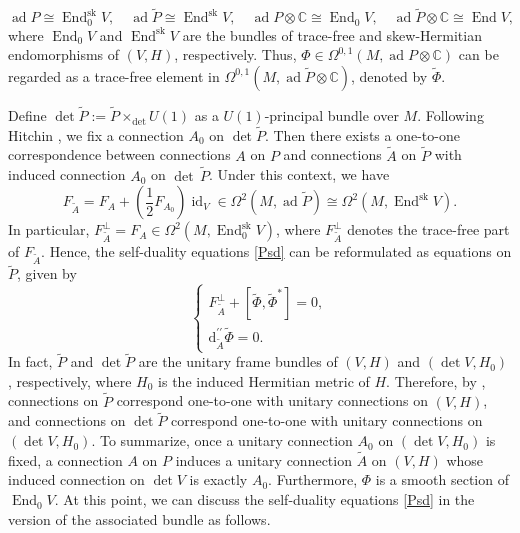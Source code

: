 \documentclass[a4paper]{amsart}
\theoremstyle{definition}
\theoremstyle{remark}
\numberwithin{equation}{section}
\begin{document}
\[
\operatorname{ad} P \cong \operatorname{End}_0^{\text{sk}} V, \quad \operatorname{ad} \tilde{P} \cong \operatorname{End}^{\text{sk}} V, \quad \operatorname{ad} P \otimes \mathbb{C} \cong \operatorname{End}_0 V, \quad \operatorname{ad} \tilde{P} \otimes \mathbb{C} \cong \operatorname{End} V,
\]
where $\operatorname{End}_0 V$ and $\operatorname{End}^{\text{sk}} V$ are the bundles of trace-free and skew-Hermitian endomorphisms of $(V, H)$, respectively. Thus, $\Phi \in \Omega^{0,1}(M, \operatorname{ad} P \otimes \mathbb{C})$ can be regarded as a trace-free element in $\Omega^{0,1}(M, \operatorname{ad} \tilde{P} \otimes \mathbb{C})$, denoted by $\tilde \Phi$.

Define $\det \tilde{P} := \tilde P \times_{\det} U(1)$ as a $U(1)$-principal bundle over $M$. Following Hitchin \cite[Section 2]{hitchin1987self}, we fix a connection $A_0$ on $\det \tilde{P}$. Then there exists a one-to-one correspondence between connections $A$ on $P$ and connections $\tilde{A}$ on $\tilde{P}$ with induced connection $A_0$ on $\det\,\tilde{P}$. Under this context, we have
\[
F_{\tilde{A}} = F_A + \left(\frac{1}{2} F_{A_0}\right) \operatorname{id}_V \in \Omega^2(M, \operatorname{ad} \tilde{P}) \cong \Omega^2(M, \operatorname{End}^{\text{sk}} V).
\]
In particular, $F_{\tilde{A}}^\perp = F_A \in \Omega^2(M, \operatorname{End}_0^{\text{sk}} V)$, where $F_{\tilde{A}}^\perp$ denotes the trace-free part of $F_{\tilde{A}}$. Hence, the self-duality equations \eqref{Psd} can be reformulated as equations on $\tilde{P}$, given by
\begin{equation*}
\begin{cases}
F_{\tilde{A}}^\perp + [\tilde{\Phi}, \tilde{\Phi}^*] = 0, \\
\mathrm{d}_{\tilde{A}}^{\prime\prime} \tilde{\Phi} = 0.
\end{cases}
\end{equation*}
In fact, $\tilde{P}$ and $\det \tilde{P}$ are the unitary frame bundles of $(V, H)$ and $(\det V, H_0)$, respectively, where $H_0$ is the induced Hermitian metric of $H$. Therefore, by \cite[Definition~2.1.8]{joyce2000compact}, connections on $\tilde{P}$ correspond one-to-one with unitary connections on $(V, H)$, and connections on $\det \tilde{P}$ correspond one-to-one with unitary connections on $(\det V, H_0)$. To summarize, once a unitary connection $A_0$ on $(\det V, H_0)$ is fixed, a connection $A$ on $P$ induces a unitary connection $\tilde{A}$ on $(V, H)$ whose induced connection on $\det V$ is exactly $A_0$. Furthermore, $\Phi$ is a smooth section of $\operatorname{End}_0 V$. At this point, we can discuss the self-duality equations \eqref{Psd} in the version of the associated
bundle as follows.
\end{document}
